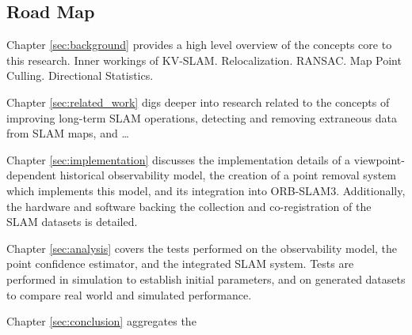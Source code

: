 \subsection{Road Map}

Chapter \ref{sec:background} provides a high level overview of the concepts core to this research. Inner workings of KV-SLAM. Relocalization. RANSAC. Map Point Culling. Directional Statistics.

Chapter \ref{sec:related_work} digs deeper into research related to the concepts of improving long-term SLAM operations, detecting and removing extraneous data from SLAM maps, and \dots

Chapter \ref{sec:implementation} discusses the implementation details of a viewpoint-dependent historical observability model, the creation of a point removal system which implements this model, and its integration into ORB-SLAM3. Additionally, the hardware and software backing the collection and co-registration of the SLAM datasets is detailed.

Chapter \ref{sec:analysis} covers the tests performed on the observability model, the point confidence estimator, and the integrated SLAM system. Tests are performed in simulation to establish initial parameters, and on generated datasets to compare real world and simulated performance.

Chapter \ref{sec:conclusion} aggregates the 